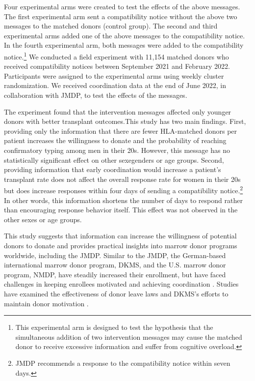 \documentclass[
  11pt,
  a4paper
]{article}
\begin{document}
Four experimental arms were created to test the effects of the above messages. The first experimental arm sent a compatibility notice without the above two messages to the matched donors (control group). The second and third experimental arms added one of the above messages to the compatibility notice. In the fourth experimental arm, both messages were added to the compatibility notice.\footnote{This experimental arm is designed to test the hypothesis that the simultaneous addition of two intervention messages may cause the matched donor to receive excessive information and suffer from cognitive overload.} We conducted a field experiment with 11,154 matched donors who received compatibility notices between September 2021 and February 2022. Participants were assigned to the experimental arms using weekly cluster randomization. We received coordination data at the end of June 2022, in collaboration with JMDP, to test the effects of the messages.

The experiment found that the intervention messages affected only younger donors with better transplant outcomes.This study has two main findings. First, providing only the information that there are fewer HLA-matched donors per patient increases the willingness to donate and the probability of reaching confirmatory typing among men in their 20s. However, this message has no statistically significant effect on other sexegenders or age groups. Second, providing information that early coordination would increase a patient's transplant rate does not affect the overall response rate for women in their 20s but does increase responses within four days of sending a compatibility notice.\footnote{JMDP recommends a response to the compatibility notice within seven days.} In other words, this information shortens the number of days to respond rather than encouraging response behavior itself. This effect was not observed in the other sexes or age groups.

This study suggests that information can increase the willingness of potential donors to donate and provides practical insights into marrow donor programs worldwide, including the JMDP. Similar to the JMDP, the German-based international marrow donor program, DKMS, and the U.S. marrow donor program, NMDP, have steadily increased their enrollment, but have faced challenges in keeping enrollees motivated and achieving coordination \citep{Switzer1999, Switzer2004, Haylock2022}. Studies have examined the effectiveness of donor leave laws \citep{Lacetera2014} and DKMS's efforts to maintain donor motivation \citep{Haylock2022}.
\end{document}
